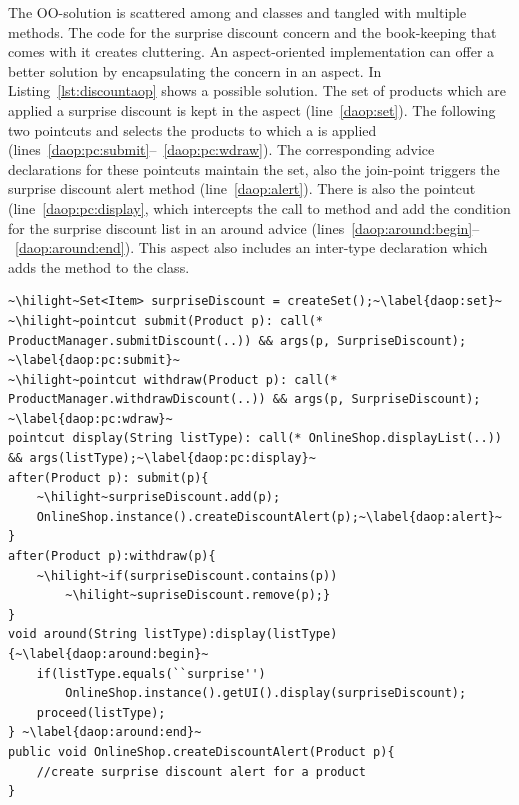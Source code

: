The OO-solution is scattered among  and  classes and tangled with multiple methods. The code for the surprise discount concern and the book-keeping that comes with it creates cluttering. 
An aspect-oriented implementation can offer a better solution by encapsulating the concern in an aspect. 
In Listing~\ref{lst:discountaop} shows a possible solution. The set of products which are applied a surprise discount is kept in the aspect (line~\ref{daop:set}). The following two pointcuts  and  selects the products to which a  is applied (lines~\ref{daop:pc:submit}--~\ref{daop:pc:wdraw}). The corresponding advice declarations for these pointcuts maintain the  set, also the  join-point triggers the surprise discount alert method (line~\ref{daop:alert}). There is also the  pointcut (line~\ref{daop:pc:display}, which intercepts the call to  method and add the condition for the surprise discount list in an around advice (lines~\ref{daop:around:begin}--~\ref{daop:around:end}). This aspect also includes an inter-type declaration which adds the  method to the  class.


\begin{lstlisting}[float=h, caption={An Aspectj implementation of discount alert concern}, label={lst:discountaop}]
~\hilight~Set<Item> surpriseDiscount = createSet();~\label{daop:set}~
~\hilight~pointcut submit(Product p): call(* ProductManager.submitDiscount(..)) && args(p, SurpriseDiscount); ~\label{daop:pc:submit}~
~\hilight~pointcut withdraw(Product p): call(* ProductManager.withdrawDiscount(..)) && args(p, SurpriseDiscount); ~\label{daop:pc:wdraw}~
pointcut display(String listType): call(* OnlineShop.displayList(..)) && args(listType);~\label{daop:pc:display}~
after(Product p): submit(p){
	~\hilight~surpriseDiscount.add(p);
	OnlineShop.instance().createDiscountAlert(p);~\label{daop:alert}~
}
after(Product p):withdraw(p){
	~\hilight~if(surpriseDiscount.contains(p))
		~\hilight~supriseDiscount.remove(p);}
}
void around(String listType):display(listType){~\label{daop:around:begin}~
	if(listType.equals(``surprise'')
		OnlineShop.instance().getUI().display(surpriseDiscount);
	proceed(listType);	
} ~\label{daop:around:end}~
public void OnlineShop.createDiscountAlert(Product p){
	//create surprise discount alert for a product
}
\end{lstlisting}

